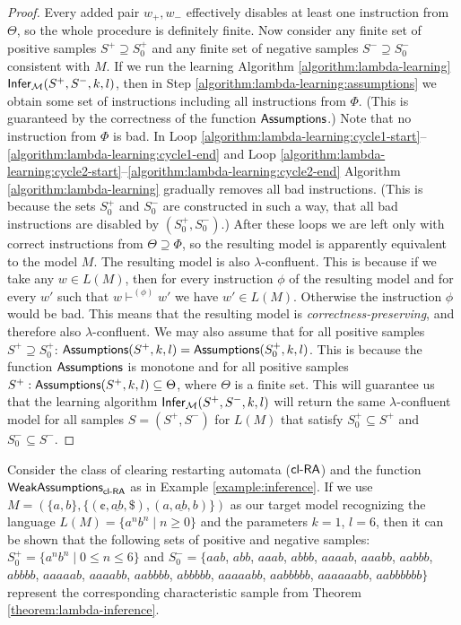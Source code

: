 \begin{proof}
Every added pair $w_+, w_-$ effectively disables at least one instruction from $\Theta$, so the whole procedure is definitely finite. Now consider any finite set of positive samples $S^+ \supseteq S_0^+$ and any finite set of negative samples $S^- \supseteq S_0^-$ consistent with $M$. If we run the learning Algorithm \ref{algorithm:lambda-learning} $\textup{\sf Infer}_{\textup{\sf $\mathcal{M}$}}(S^+, S^-, k, l)$, then in Step \ref{algorithm:lambda-learning:assumptions} we obtain some set of instructions including all instructions from $\Phi$. (This is guaranteed by the correctness of the function $\textup{\sf Assumptions}$.) Note that no instruction from $\Phi$ is bad. In Loop \ref{algorithm:lambda-learning:cycle1-start}--\ref{algorithm:lambda-learning:cycle1-end} and Loop \ref{algorithm:lambda-learning:cycle2-start}--\ref{algorithm:lambda-learning:cycle2-end} Algorithm \ref{algorithm:lambda-learning} gradually removes all bad instructions. (This is because the sets $S_0^+$ and $S_0^-$ are constructed in such a way, that all bad instructions are disabled by $(S_0^+, S_0^-)$.) After these loops we are left only with correct instructions from $\Theta \supseteq \Phi$, so the resulting model is apparently equivalent to the model $M$. The resulting model is also $\lambda$-confluent. This is because if we take any $w \in L(M)$, then for every instruction $\phi$ of the resulting model and for every $w'$ such that $w \vdash^{(\phi)} w'$ we have $w' \in L(M)$. Otherwise the instruction $\phi$ would be bad. This means that the resulting model is \emph{correctness-preserving}, and therefore also $\lambda$-confluent. We may also assume that for all positive samples $S^+ \supseteq S_0^+$: $\textup{\sf Assumptions}(S^+, k, l) = \textup{\sf Assumptions}(S_0^+, k, l)$. This is because the function $\textup{\sf Assumptions}$ is monotone and for all positive samples $S^+: \textup{\sf Assumptions}(S^+, k, l) \subseteq \Theta$, where $\Theta$ is a finite set. This will guarantee us that the learning algorithm $\textup{\sf Infer}_{\textup{\sf $\mathcal{M}$}}(S^+, S^-, k, l)$ will return the same $\lambda$-confluent model for all samples $S = (S^+, S^-)$ for $L(M)$ that satisfy $S_0^+ \subseteq S^+$ and $S_0^- \subseteq S^-$.
\end{proof}

\begin{example}[\citep{C12}]
Consider the class of clearing restarting automata ($\textup{\sf cl-RA\/}$) and the function $\textup{\sf WeakAssumptions}_{\textup{\sf cl-RA\/}}$ as in Example \ref{example:inference}. If we use $M = (\{a, b\}, \{(\cent, \underline{ab}, \$), (a, \underline{ab}, b) \})$ as our target model recognizing the language $L(M) = \{a^n b^n \mid n \ge 0 \}$ and the parameters $k = 1$, $l = 6$, then it can be shown that the following sets of positive and negative samples: $S_0^+ = \{ a^n b^n \mid 0 \le n \le 6 \}$ and $S_0^- = \{ aab$, $abb$, $aaab$, $abbb$, $aaaab$, $aaabb$, $aabbb$, $abbbb$, $aaaaab$, $aaaabb$, $aabbbb$, $abbbbb$, $aaaaabb$, $aabbbbb$, $aaaaaabb$, $aabbbbbb \}$ represent the corresponding characteristic sample from Theorem \ref{theorem:lambda-inference}.
\end{example}


